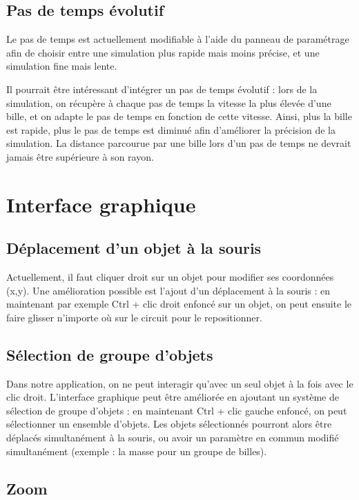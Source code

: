 \documentclass{report}
\begin{document}
\subsection{Pas de temps évolutif}

Le pas de temps est actuellement modifiable à l’aide du panneau de paramétrage afin de choisir entre une simulation plus rapide mais moins précise, et une simulation fine mais lente. 

Il pourrait être intéressant d’intégrer un pas de temps évolutif : lors de la simulation, on récupère à chaque pas de temps la vitesse la plus élevée d’une bille, et on adapte le pas de temps en fonction de cette vitesse. Ainsi, plus la bille est rapide, plus le pas de temps est diminué afin d’améliorer la précision de la simulation. La distance parcourue par une bille lors d’un pas de temps ne devrait jamais être supérieure à son rayon.

\section{Interface graphique}

\subsection{Déplacement d'un objet à la souris}

Actuellement, il faut cliquer droit sur un objet pour modifier ses coordonnées (x,y). Une amélioration possible est l’ajout d’un déplacement à la souris : en maintenant par exemple Ctrl + clic droit enfoncé sur un objet, on peut ensuite le faire glisser n’importe où sur le circuit pour le repositionner.

\subsection{Sélection de groupe d'objets}

Dans notre application, on ne peut interagir qu’avec un seul objet à la fois avec le clic droit. L’interface graphique peut être améliorée en ajoutant un système de sélection de groupe d’objets : en maintenant Ctrl + clic gauche enfoncé, on peut sélectionner un ensemble d’objets. Les objets sélectionnés pourront alors être déplacés simultanément à la souris, ou avoir un paramètre en commun modifié simultanément (exemple : la masse pour un groupe de billes).

\subsection{Zoom}
\end{document}

